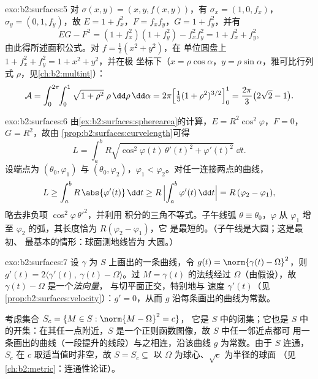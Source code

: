 \begin{solution}{exo:b2:surfaces:5}
对 $\sigma(x, y) = (x, y, f(x,y))$，有 $\sigma_x = (1, 0, f_x)$，
$\sigma_y = (0, 1, f_y)$，故 $E = 1 + f_x^2$，$F = f_xf_y$，$G = 1
+ f_y^2$，并有
\[
EG - F^2 = (1 + f_x^2)(1 + f_y^2) - f_x^2f_y^2
= 1 + f_x^2 + f_y^2 ,
\]
由此得所述面积公式。对 $f = \frac12(x^2 + y^2)$，在
单位圆盘上 $1 + f_x^2 + f_y^2 = 1 + x^2 + y^2$，并在极
坐标下（$x = \rho\cos\alpha$，$y = \rho\sin\alpha$，雅可比行列式
$\rho$，见\cref{ch:b2:multint}）：
\[
\mathcal{A}
= \int_0^{2\pi}\!\!\int_0^1 \sqrt{1 + \rho^2}\;\rho
\,\dd\rho\,\dd\alpha
= 2\pi\Bigl[\tfrac13(1 + \rho^2)^{3/2}\Bigr]_0^1
= \frac{2\pi}{3}\bigl(2\sqrt2 - 1\bigr).
\]
\end{solution}

\begin{solution}{exo:b2:surfaces:6}
由\cref{ex:b2:surfaces:spherearea}的计算，$E =
R^2\cos^2\varphi$，$F = 0$，$G = R^2$，故由
\cref{prop:b2:surfaces:curvelength}可得
\[
L = \int_a^b R\sqrt{\cos^2\varphi(t)\,\theta'(t)^2
+ \varphi'(t)^2}\;\dd t .
\]
设端点为 $(\theta_0, \varphi_1)$ 与 $(\theta_0,
\varphi_2)$，$\varphi_1 < \varphi_2$。对任一连接两点的曲线，
\[
L \geq \int_a^b R\,\abs{\varphi'(t)}\,\dd t
\geq R\,\Bigl|\int_a^b \varphi'(t)\,\dd t\Bigr|
= R\,(\varphi_2 - \varphi_1),
\]
略去非负项 $\cos^2\varphi\,\theta'^2$，并利用
积分的三角不等式。子午线弧
$\theta \equiv \theta_0$，$\varphi$ 从 $\varphi_1$ 增至
$\varphi_2$ 的弧，其长度恰为 $R(\varphi_2 - \varphi_1)$，它
是最短的。（子午线是大圆；这是最初、
最基本的情形：球面测地线皆为
大圆。）
\end{solution}

\begin{solution}{exo:b2:surfaces:7}
设 $\gamma$ 为 $S$ 上画出的一条曲线，令 $g(t) = \norm{\gamma(t)
- \Omega}^2$，则 $g'(t) = 2\langle \gamma'(t),\ \gamma(t) -
\Omega\rangle$。过 $M = \gamma(t)$ 的法线经过
$\Omega$（由假设），故 $\gamma(t) - \Omega$ 是一个\emph{法向量}，
与切平面正交，特别地与
速度 $\gamma'(t)$（见\cref{prop:b2:surfaces:velocity}）：$g' =
0$，从而 $g$ 沿每条画出的曲线为常数。

考虑集合 $S_c = \{M \in S : \norm{M - \Omega}^2 = c\}$，
它是 $S$ 中的闭集；它也是 $S$ 中的开集：在其任一点附近，$S$
是一个正则函数图像，故 $S$ 中任一邻近点都可
用一条画出的曲线（一段提升的线段）与之相连，沿该曲线 $g$ 为常数。由于
$S$ 连通，$S_c$ 在 $c$ 取适当值时非空，故 $S = S_c
\subseteq$ 以 $\Omega$ 为球心、$\sqrt c$ 为半径的球面
（见\cref{ch:b2:metric}：连通性论证）。
\end{solution}

